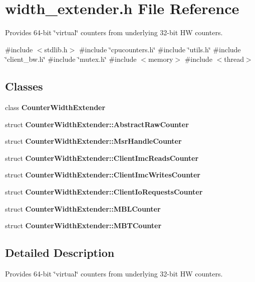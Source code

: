 \section{width\+\_\+extender.\+h File Reference}
\label{width__extender_8h}


Provides 64-\/bit \char`\"{}virtual\char`\"{} counters from underlying 32-\/bit HW counters.  


{\ttfamily \#include $<$stdlib.\+h$>$}\newline
{\ttfamily \#include \char`\"{}cpucounters.\+h\char`\"{}}\newline
{\ttfamily \#include \char`\"{}utils.\+h\char`\"{}}\newline
{\ttfamily \#include \char`\"{}client\+\_\+bw.\+h\char`\"{}}\newline
{\ttfamily \#include \char`\"{}mutex.\+h\char`\"{}}\newline
{\ttfamily \#include $<$memory$>$}\newline
{\ttfamily \#include $<$thread$>$}\newline
\subsection*{Classes}
\begin{DoxyCompactItemize}
\item 
class \textbf{ Counter\+Width\+Extender}
\item 
struct \textbf{ Counter\+Width\+Extender\+::\+Abstract\+Raw\+Counter}
\item 
struct \textbf{ Counter\+Width\+Extender\+::\+Msr\+Handle\+Counter}
\item 
struct \textbf{ Counter\+Width\+Extender\+::\+Client\+Imc\+Reads\+Counter}
\item 
struct \textbf{ Counter\+Width\+Extender\+::\+Client\+Imc\+Writes\+Counter}
\item 
struct \textbf{ Counter\+Width\+Extender\+::\+Client\+Io\+Requests\+Counter}
\item 
struct \textbf{ Counter\+Width\+Extender\+::\+M\+B\+L\+Counter}
\item 
struct \textbf{ Counter\+Width\+Extender\+::\+M\+B\+T\+Counter}
\end{DoxyCompactItemize}


\subsection{Detailed Description}
Provides 64-\/bit \char`\"{}virtual\char`\"{} counters from underlying 32-\/bit HW counters. 

